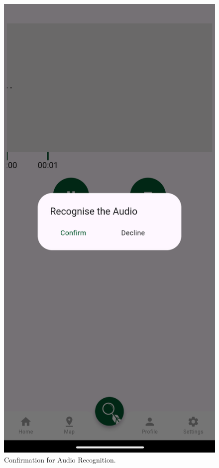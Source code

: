 \begin{figure}[h!]
    \centering
    \includegraphics[scale=0.26]{images/confirmation.png}
    \caption{Confirmation for Audio Recognition.}
\end{figure}
